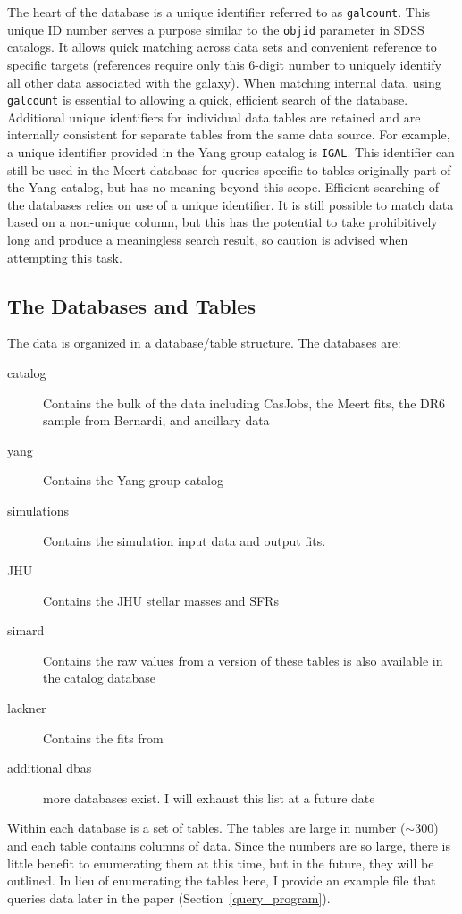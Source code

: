 \documentclass[useAMS,usenatbib,usegraphicx]{./mn2e}
\begin{document}
The heart of the database is a unique identifier referred to as \texttt{galcount}. This unique ID number serves a purpose similar to the \texttt{objid} parameter in SDSS catalogs. It allows quick matching across data sets and convenient reference to specific targets (references require only this 6-digit number to uniquely identify all other data associated with the galaxy). When matching internal data, using \texttt{galcount} is essential to allowing a quick, efficient search of the database. Additional unique identifiers for individual data tables are retained and are internally consistent for separate tables from the same data source. For example, a unique identifier provided in the Yang group catalog is \texttt{IGAL}. This identifier can still be used in the Meert database for queries specific to tables originally part of the Yang catalog, but has no meaning beyond this scope. Efficient searching of the databases relies on use of a unique identifier. It is still possible to match data based on a non-unique column, but this has the potential to take prohibitively long and produce a meaningless search result, so caution is advised when attempting this task. 

\subsection{The Databases and Tables}\label{db_desc}

The data is organized in a database/table structure. The databases are:
\begin{description}
 \item[catalog] Contains the bulk of the data including CasJobs, the Meert fits, the DR6 sample from Bernardi, and ancillary data 
 \item[yang] Contains the Yang group catalog
 \item[simulations] Contains the simulation input data and output fits.
 \item[JHU] Contains the JHU stellar masses and SFRs
 \item[simard] Contains the raw values from \cite{simard11} a version of these tables is also available in the catalog database
 \item[lackner] Contains the fits from \cite{Lackner2012}
 \item[additional dbas] more databases exist. I will exhaust this list at a future date
\end{description}

Within each database is a set of tables. The tables are large in number ($\sim 300$) and each table contains columns of data. Since the numbers are so large, there is little benefit to enumerating them at this time, but in the future, they will be outlined. In lieu of enumerating the tables here, I provide an example file that queries data later in the paper (Section~\ref{query_program}). 
\end{document}

